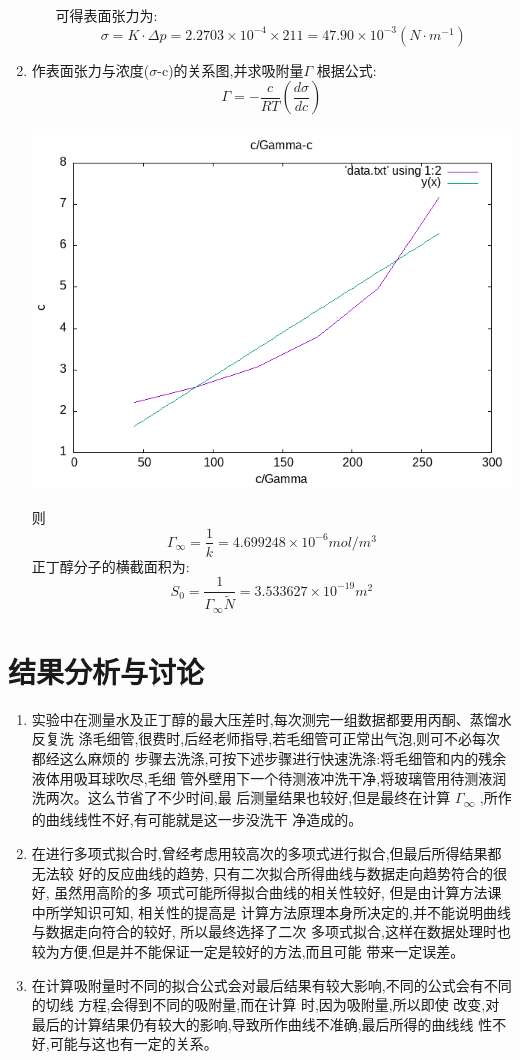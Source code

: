 \documentclass[11pt]{report}
\begin{document}
\begin{enumerate}
\begin{enumerate}
可得表面张力为:
\[
    \sigma=K\cdot \Delta p=2.2703\times 10^{-4}\times 211=47.90\times 10^{-3}(N\cdot m^{-1})
    \]
\end{enumerate}

\item 作表面张力与浓度(\(\sigma\)-c)的关系图,并求吸附量\(\Gamma\)
\label{sec:org7a70388}
根据公式:
\[
\Gamma=-\frac{c}{RT}\left(\frac{d\sigma}{dc}\right)
\]
\begin{center}
\includegraphics[width=.9\linewidth]{../img/out.png}
\end{center}
则
   \[
   \Gamma_{\infty}=\frac{1}{k}=4.699248\times 10^{-6} mol/m^{3}
   \]
   正丁醇分子的横截面积为:
   \[
   S_{0}=\frac{1}{\Gamma_{\infty}\widetilde{N}}=3.533627\times 10^{-19} m^{2}
   \]
\end{enumerate}

\section{结果分析与讨论}
\label{sec:orgc9e26a2}
\begin{enumerate}
\item 实验中在测量水及正丁醇的最大压差时,每次测完一组数据都要用丙酮、蒸馏水反复洗
涤毛细管,很费时,后经老师指导,若毛细管可正常出气泡,则可不必每次都经这么麻烦的
步骤去洗涤,可按下述步骤进行快速洗涤:将毛细管和内的残余液体用吸耳球吹尽,毛细
管外壁用下一个待测液冲洗干净,将玻璃管用待测液润洗两次。这么节省了不少时间,最
后测量结果也较好,但是最终在计算 \(\Gamma\)\textsubscript{\(\infty\)} ,所作的曲线线性不好,有可能就是这一步没洗干
净造成的。

\item 在进行多项式拟合时,曾经考虑用较高次的多项式进行拟合,但最后所得结果都无法较
好的反应曲线的趋势, 只有二次拟合所得曲线与数据走向趋势符合的很好, 虽然用高阶的多
项式可能所得拟合曲线的相关性较好, 但是由计算方法课中所学知识可知, 相关性的提高是
计算方法原理本身所决定的,并不能说明曲线与数据走向符合的较好, 所以最终选择了二次
多项式拟合,这样在数据处理时也较为方便,但是并不能保证一定是较好的方法,而且可能
带来一定误差。
\item 在计算吸附量时不同的拟合公式会对最后结果有较大影响,不同的公式会有不同的切线
方程,会得到不同的吸附量,而在计算 时,因为吸附量,所以即使
改变,对最后的计算结果仍有较大的影响,导致所作曲线不准确,最后所得的曲线线
性不好,可能与这也有一定的关系。
\end{enumerate}
\end{document}

